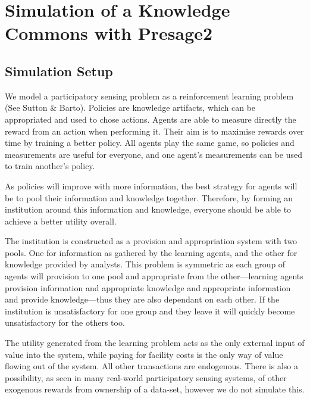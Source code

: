 \chapter{Simulation of a Knowledge Commons with Presage2}

\section{Simulation Setup}

We model a participatory sensing problem as a reinforcement learning problem (See Sutton \& Barto). Policies are knowledge artifacts, which can be appropriated and used to chose actions. Agents are able to measure directly the reward from an action when performing it. Their aim is to maximise rewards over time by training a better policy. All agents play the same game, so policies and measurements are useful for everyone, and one agent's measurements can be used to train another's policy.

As policies will improve with more information, the best strategy for agents will be to pool their information and knowledge together. 
Therefore, by forming an institution around this information and knowledge, everyone should be able to achieve a better utility overall.


The institution is constructed as a provision and appropriation system with two pools. One for information as gathered by the learning agents, and the other for knowledge provided by analysts. This problem is symmetric as each group of agents will provision to one pool and appropriate from the other---learning agents provision information and appropriate knowledge and appropriate information and provide knowledge---thus they are also dependant on each other. If the institution is unsatisfactory for one group and they leave it will quickly become unsatisfactory for the others too.

The utility generated from the learning problem acts as the only external input of value into the system, while paying for facility costs is the only way of value flowing out of the system. All other transactions are endogenous. There is also a possibility, as seen in many real-world participatory sensing systems, of other exogenous rewards from ownership of a data-set, however we do not simulate this.


